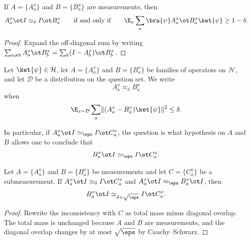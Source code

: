 \begin{lemma}\label{prop:simeq-for-measurements}
	\leanok
	If $A=\{A_a^x\}$ and $B=\{B_a^x\}$ are measurements, then
	\[
		A_a^x \ot I \simeq_\delta I \ot B_a^x
		\qquad\text{if and only if}\qquad
		\E_x \sum_a \bra{\psi} A_a^x \ot B_a^x \ket{\psi} \ge 1-\delta.
	\]
\end{lemma}
\begin{proof}
	\leanok
	Expand the off-diagonal sum by writing $\sum_{a \ne b} A_a^x \ot B_b^x = \sum_b (I-A_b^x) \ot B_b^x$.
\end{proof}

\begin{definition}\label{def:approx_delta}
	\leanok
	Let $\ket{\psi} \in \mathcal H$, let $A=\{A_a^x\}$ and $B=\{B_a^x\}$ be families of operators on $\mathcal H$, and let $\mathcal D$ be a distribution on the question set. We write
	\[
		A_a^x \approx_\delta B_a^x
	\]
	when
	\[
		\E_{x \sim \mathcal D} \sum_a \lVert (A_a^x-B_a^x)\ket{\psi} \rVert^2 \le \delta.
	\]
\end{definition}

In particular, if $A^x_a \ot I \simeq_{\eps} I \ot C^x_a$, the question is what hypothesis on $A$ and $B$ allows one to conclude that
\begin{equation}\label{eq:can-we-use-approx-delta-to-derive-this}
	B^x_a \ot I \simeq_{\eps} I \ot C^x_a.
\end{equation}

\begin{lemma}\label{prop:triangle-sub}
	\leanok
	Let $A=\{A_a^x\}$ and $B=\{B_a^x\}$ be measurements and let $C=\{C_a^x\}$ be a submeasurement. If $A_a^x \ot I \simeq_\delta I \ot C_a^x$ and $A_a^x \ot I \approx_\eps B_a^x \ot I$, then
	\[
		B_a^x \ot I \simeq_{\delta+\sqrt\eps} I \ot C_a^x.
	\]
\end{lemma}
\begin{proof}
	\leanok
	Rewrite the inconsistency with $C$ as total mass minus diagonal overlap. The total mass is unchanged because $A$ and $B$ are measurements, and the diagonal overlap changes by at most $\sqrt\eps$ by Cauchy--Schwarz.
\end{proof}

